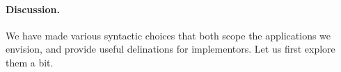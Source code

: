 
\paragraph{Discussion. }  We have made various syntactic choices that both scope the applications we envision, and provide useful delinations for implementors.  Let us first explore them a bit.  

